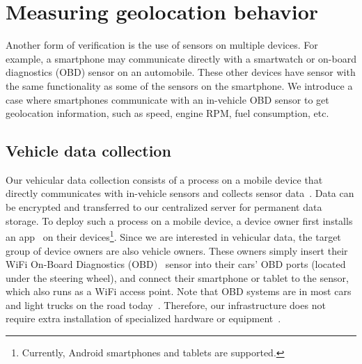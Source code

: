 \section{Measuring geolocation behavior}
\label{sec:geolocation}
Another form of verification is the use of sensors on multiple devices.  For example,
a smartphone may communicate directly with a smartwatch or on-board diagnostics (OBD)
sensor on an automobile.  These other devices have sensor with the same
functionality as some of the sensors on the smartphone.
We introduce a case where smartphones communicate with an in-vehicle OBD sensor
to get geolocation information, such as speed, engine RPM, fuel consumption, 
etc.

\subsection{Vehicle data collection}

Our vehicular data collection consists of a process on a mobile 
device that directly communicates with in-vehicle sensors and collects sensor 
data~\cite{sensor}. Data can be encrypted and transferred to our 
centralized server for permanent data storage. 
To deploy such a process on a mobile device, a device owner first installs an
app~\cite{sensor-app} on their devices\footnote{Currently, Android smartphones 
and tablets are supported.}. Since we are interested in
vehicular data, the target group of device owners are also vehicle 
owners. These owners simply insert their WiFi On-Board Diagnostics 
(OBD)~\cite{obd} sensor into their cars' OBD ports (located under the steering wheel),  
and connect their 
smartphone or tablet to the sensor, which also runs as a WiFi access 
point. Note that OBD systems are in most cars and light trucks 
on the road today~\cite{obdconnector}. Therefore, our 
infrastructure does not require extra installation of specialized  
hardware or equipment~\cite{reininger2015first}. 

